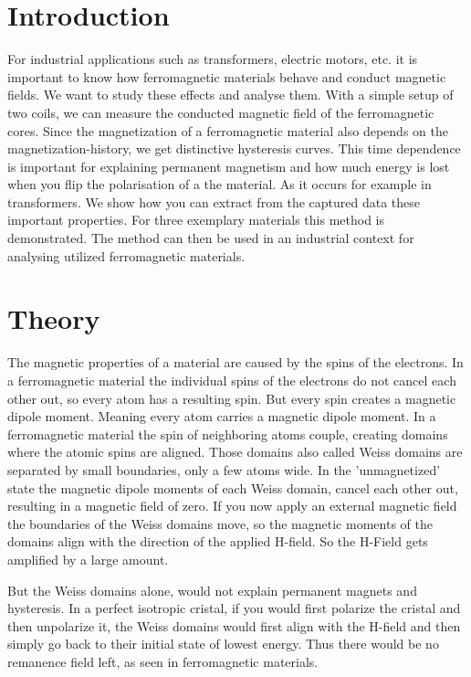 \documentclass[a4paper,10pt,twocolumn]{article}
\begin{document}
    \section{Introduction}
    
    For industrial applications such as transformers, electric motors, etc. it is important to know how ferromagnetic
    materials behave and conduct magnetic fields.
    We want to study these effects and analyse them.
    With a simple setup of two coils, we can measure the conducted magnetic field of the ferromagnetic cores.
    Since the magnetization of a ferromagnetic material also depends on the magnetization-history, we get distinctive hysteresis curves.
    This time dependence is important for explaining permanent magnetism and how much energy is lost when you flip the
    polarisation of a the material.
    As it occurs for example in transformers.
    We show how you can extract from the captured data these important properties.
    For three exemplary materials this method is demonstrated.
    The method can then be used in an industrial context for analysing utilized ferromagnetic materials.
    
    \section{Theory}
    \label{sec:Theory}
    
    The magnetic properties of a material are caused by the spins of the electrons.
    In a ferromagnetic material the individual spins of the electrons do not cancel each other out, so every atom has a
    resulting spin.
    But every spin creates a magnetic dipole moment.
    Meaning every atom carries a magnetic dipole moment.
    In a ferromagnetic material the spin of neighboring atoms couple,
    creating domains where the atomic spins are aligned. 
    Those domains also called Weiss domains are separated by small boundaries, only a few atoms wide\cite{feymanLecturesWeisDomains}.
    In the 'unmagnetized' state the magnetic dipole moments of each Weiss domain, cancel each other out, resulting in
    a magnetic field of zero.
    If you now apply an external magnetic field the boundaries of the Weiss domains move, so the magnetic moments of the
    domains align with the direction of the applied H-field.
    So the H-Field gets amplified by a large amount.
    
    But the Weiss domains alone, would not explain permanent magnets and hysteresis. 
    In a perfect isotropic cristal, if you would first polarize the cristal and then unpolarize it, 
    the Weiss domains would first align with the H-field and then simply go back to their initial state of lowest energy.
    Thus there would be no remanence field left, as seen in ferromagnetic materials.
    
\end{document}
